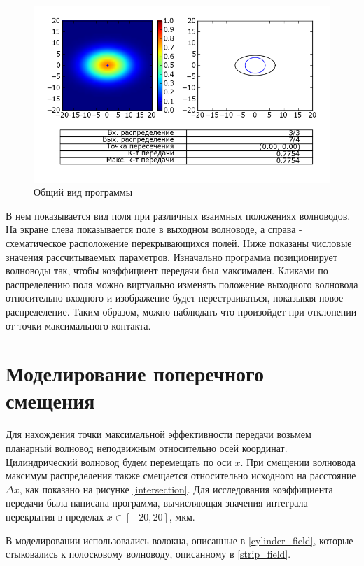 \begin{figure}[h!]
	\includegraphics[width=\linewidth]{img/heatmap.png}
	\caption{Общий вид программы}
\end{figure}

В нем показывается вид поля при различных взаимных положениях волноводов. На экране слева показывается поле в выходном волноводе, а справа - схематическое расположение перекрывающихся полей. Ниже показаны числовые значения рассчитываемых параметров. Изначально программа позиционирует волноводы так, чтобы коэффициент передачи был максимален. Кликами по распределению поля можно виртуально изменять положение выходного волновода относительно входного и изображение будет перестраиваться, показывая новое распределение. Таким образом, можно наблюдать что произойдет при отклонении от точки максимального контакта.

\section{Моделирование поперечного смещения}
\label{transverse_section}

Для нахождения точки максимальной эффективности передачи возьмем планарный волновод неподвижным относительно осей координат. Цилиндрический волновод будем перемещать по оси $x$. При смещении волновода максимум распределения также смещается относительно исходного на расстояние $\Delta x$, как показано на рисунке \ref{intersection}. Для исследования коэффициента передачи была написана программа, вычисляющая значения интеграла перекрытия в пределах $x \in [-20, 20]$, мкм.

В моделировании использовались волокна, описанные в \ref{cylinder_field}, которые стыковались к полосковому волноводу, описанному в \ref{strip_field}.

